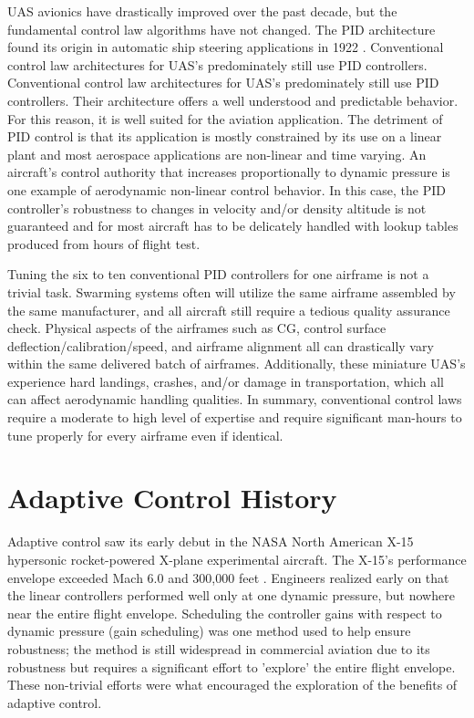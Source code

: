 \ac{UAS} avionics have drastically improved over the past decade, but the fundamental control law algorithms have not changed.  The \ac{PID} architecture found its origin in automatic ship steering applications in 1922 \cite{minorsky1922pid}.  Conventional control law architectures for \ac{UAS}'s predominately still use \ac{PID} controllers.  Conventional control law architectures for \ac{UAS}'s predominately still use \ac{PID} controllers.  Their architecture offers a well understood and predictable behavior.  For this reason, it is well suited for the aviation application.  The detriment of \ac{PID} control is that its application is mostly constrained by its use on a linear plant and most aerospace applications are non-linear and time varying.   An aircraft's control authority that increases proportionally to dynamic pressure is one example of aerodynamic non-linear control behavior.  In this case, the \ac{PID} controller's robustness to changes in velocity and/or density altitude is not guaranteed and for most aircraft has to be delicately handled with lookup tables produced from hours of flight test.

Tuning the six to ten conventional \ac{PID} controllers for one airframe is not a trivial task.  Swarming systems often will utilize the same airframe assembled by the same manufacturer, and all aircraft still require a tedious quality assurance check.  Physical aspects of the airframes such as \ac{CG}, control surface deflection/calibration/speed, and airframe alignment all can drastically vary within the same delivered batch of airframes.  Additionally, these miniature \ac{UAS}'s experience hard landings, crashes, and/or damage in transportation, which all can affect aerodynamic handling qualities.  In summary, conventional control laws require a moderate to high level of expertise and require significant man-hours to tune properly for every airframe even if identical.  


\section{Adaptive Control History}\label{history}
Adaptive control saw its early debut in the NASA North American X-15 hypersonic rocket-powered X-plane experimental aircraft.  The X-15's performance envelope exceeded Mach 6.0 and 300,000 feet \cite{jenkins2000x15specs}.  Engineers realized early on that the linear controllers performed well only at one dynamic pressure, but nowhere near the entire flight envelope.  Scheduling the controller gains with respect to dynamic pressure (gain scheduling) was one method used to help ensure robustness;  the method is still widespread in commercial aviation due to its robustness but requires a significant effort to 'explore' the entire flight envelope.  These non-trivial efforts were what encouraged the exploration of the benefits of adaptive control.

